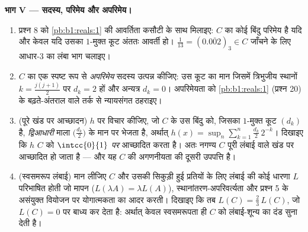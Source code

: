 \begin{problem}[{सप्ताहांत समस्या --- कैंटर का मध्य-तिहाई \omterm{def:b1:logic:sets}{समुच्चय}: लंबाई शून्य, अगणनीय, पूर्ण,
और $C + C =
\intcc{0}{2}$}]
\medskip \noindent\textbf{भाग V --- सदस्य, परिमेय और अपरिमेय।}
\begin{enumerate}[resume]
  \item प्रश्न 8 को \cref{pb:b1:reals:1} की आवर्तिता कसौटी के साथ मिलाइए:
  $C$ का कोई बिंदु परिमेय है यदि और केवल यदि उसका $1$-मुक्त कूट अंततः आवर्ती
  हो। $\frac1{13} = (0.\overline{002})_3 \in C$ जाँचने के लिए आधार-$3$ का
  लंबा भाग चलाइए।
  \item $C$ का एक स्पष्ट रूप से \emph{अपरिमेय} सदस्य उत्पन्न कीजिए: उस कूट
  का मान जिसमें त्रिभुजीय स्थानों $k = \frac{j(j+1)}{2}$ पर $d_k = 2$ हों और
  अन्यत्र $d_k = 0$। अपरिमेयता को \cref{pb:b1:reals:1} (प्रश्न 20) के
  बढ़ते-अंतराल वाले तर्क से न्यायसंगत ठहराइए।
  \item (पूरे खंड पर आच्छादन) $h$ पर विचार कीजिए, जो $C$ के उस बिंदु को,
  जिसका $1$-मुक्त कूट $(d_k)$ है, \emph{द्विआधारी} माला
  $\bigl(\frac{d_k}2\bigr)$ के मान पर भेजता है, अर्थात् $h(x) = \sup_n
  \sum_{k=1}^n \frac{d_k}{2}\,2^{-k}$। दिखाइए कि $h$ $C$ को $\intcc{0}{1}$
  \emph{पर} आच्छादित करता है। अतः नगण्य $C$ पूरी लंबाई वाले खंड पर आच्छादित
  हो जाता है --- और यह $C$ की अगणनीयता की दूसरी उपपत्ति है।
  \item (स्वसमरूप लंबाई) मान लीजिए $C$ और उसकी सिकुड़ी हुई प्रतियों के लिए
  लंबाई की कोई धारणा $L$ परिभाषित होती जो मापन ($L(\lambda A) = \lambda
  L(A)$), स्थानांतरण-अपरिवर्त्यता और प्रश्न 5 के असंयुक्त वियोजन पर
  योगात्मकता का आदर करती। दिखाइए कि तब $L(C) = \frac23\,L(C)$, जो $L(C) = 0$
  पर बाध्य कर देता है: अर्थात् केवल स्वसमरूपता ही $C$ को लंबाई-शून्य का दंड
  सुना देती है।
\end{enumerate}


\end{problem}
